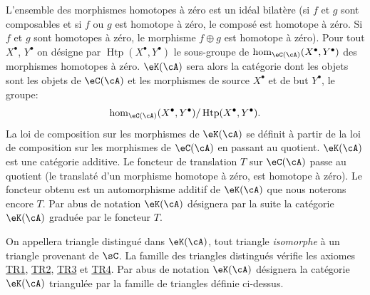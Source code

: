 \subsubsection{}\label{VIII:1-2-2}

L'ensemble des morphismes homotopes à zéro est un idéal bilatère (si 
$f$ et $g$ sont composables et si $f$ ou $g$ est homotope à zéro, le composé 
est homotope à zéro. Si $f$ et $g$ sont homotopes à zéro, le morphisme 
$f\oplus g$ est homotope à zéro). Pour tout  $X^\bullet$, 
$Y^\bullet$ on désigne par $\operatorname{Htp}(X^\bullet,Y^\bullet)$ le 
sous-groupe de $\hom_{\eC(\cA)}(X^\bullet,Y^\bullet)$ des morphismes homotopes 
à zéro. $\eK(\cA)$ sera alors la catégorie dont les objets sont les 
objets de $\eC(\cA)$ et les morphismes de source $X^\bullet$ et de but 
$Y^\bullet$, le groupe: 
\[
  \hom_{\eC(\cA)}(X^\bullet,Y^\bullet) / \operatorname{Htp}(X^\bullet,Y^\bullet) \text{.}
\]
La loi de composition sur les morphismes de $\eK(\cA)$ se définit à partir 
de la loi de composition sur les morphismes de $\eC(\cA)$ en passant au 
quotient. $\eK(\cA)$ est une catégorie additive. Le foncteur de translation 
$T$ sur $\eC(\cA)$ passe au quotient (le translaté d'un morphisme homotope 
à zéro, est homotope à zéro). Le foncteur obtenu est un automorphisme 
additif de $\eK(\cA)$ que nous noterons encore $T$. Par abus de notation 
$\eK(\cA)$ désignera par la suite la catégorie $\eK(\cA)$ graduée par le 
foncteur $T$. 

On appellera triangle distingué dans $\eK(\cA)$, tout triangle 
\emph{isomorphe} à un triangle provenant de $\sC$. La famille des triangles 
distingués vérifie les axiomes \hyperlink{VIII:TR1}{TR1}, 
\hyperlink{VIII:TR2}{TR2}, \hyperlink{VIII:TR3}{TR3} et 
\hyperlink{VIII:TR4}{TR4}. Par abus de notation $\eK(\cA)$ désignera la 
catégorie $\eK(\cA)$ triangulée par la famille de triangles définie 
ci-dessus. 





\subsubsection{}\label{VIII:1-2-3}


